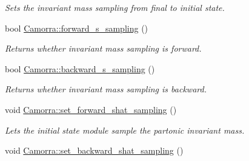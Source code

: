 \begin{DoxyCompactItemize}
\begin{DoxyCompactList}\small\item\em Sets the invariant mass sampling from final to initial state. \end{DoxyCompactList}\item 
\hypertarget{a00831_a338ee68efb1f21066746b1371f7e55b8}{
bool \hyperlink{a00831_a338ee68efb1f21066746b1371f7e55b8}{Camorra::forward\_\-s\_\-sampling} ()}
\label{a00831_a338ee68efb1f21066746b1371f7e55b8}

\begin{DoxyCompactList}\small\item\em Returns whether invariant mass sampling is forward. \end{DoxyCompactList}\item 
\hypertarget{a00831_a10d06d9eeb886cc2282993cf798acd48}{
bool \hyperlink{a00831_a10d06d9eeb886cc2282993cf798acd48}{Camorra::backward\_\-s\_\-sampling} ()}
\label{a00831_a10d06d9eeb886cc2282993cf798acd48}

\begin{DoxyCompactList}\small\item\em Returns whether invariant mass sampling is backward. \end{DoxyCompactList}\item 
\hypertarget{a00831_af3c92b5bd28219c042733f3c86a6fa2d}{
void \hyperlink{a00831_af3c92b5bd28219c042733f3c86a6fa2d}{Camorra::set\_\-forward\_\-shat\_\-sampling} ()}
\label{a00831_af3c92b5bd28219c042733f3c86a6fa2d}

\begin{DoxyCompactList}\small\item\em Lets the initial state module sample the partonic invariant mass. \end{DoxyCompactList}\item 
\hypertarget{a00831_a65b84100ed1fb9d859af1f98128e0e4c}{
void \hyperlink{a00831_a65b84100ed1fb9d859af1f98128e0e4c}{Camorra::set\_\-backward\_\-shat\_\-sampling} ()}
\label{a00831_a65b84100ed1fb9d859af1f98128e0e4c}


\end{DoxyCompactItemize}
